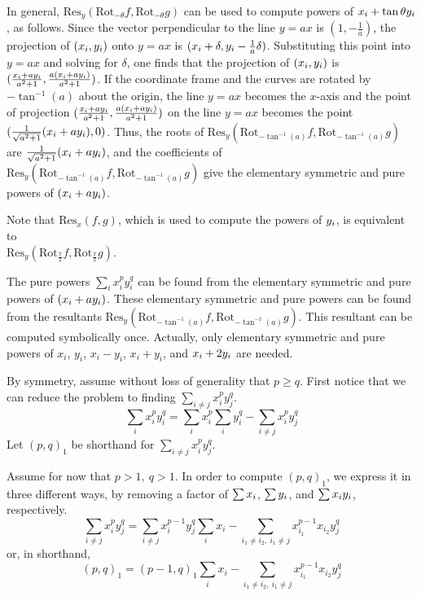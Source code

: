 In general, $\mbox{Res}_{y}(\mbox{Rot}_{-\theta}f,\mbox{Rot}_{-\theta}g)$ can be
used to compute powers of $x_{i} + \tan\theta y_{i}$, as follows.
Since the vector perpendicular to the line $y = ax$ is $(1,-\frac{1}{a})$,
the projection of $(x_{i},y_{i})$ onto $y = ax$ is $(x_{i} + \delta, y_{i} - \frac{1}{a} \delta)$.
Substituting this point into $y=ax$ and solving for $\delta$,
one finds that the projection of $(x_{i},y_{i})$ is 
$(\frac{x_{i} + ay_{i}}{a^{2} + 1},
 \frac{a(x_{i} + ay_{i})}{a^{2} + 1})$.
If the coordinate frame and the curves are rotated by $-\tan^{-1}(a)$
about the origin, the line $y = ax$ becomes the $x$-axis and the point of projection
$(\frac{x_{i} + ay_{i}}{a^{2} + 1}, \frac{a(x_{i} + ay_{i})}{a^{2} + 1})$ on the line
$y = ax$ becomes the point $(\frac{1}{\sqrt{a^{2}+1}}(x_{i} + ay_{i}), 0)$.
Thus, the roots of $\mbox{Res}_{y}(\mbox{Rot}_{-\tan^{-1}(a)}f,\mbox{Rot}_{-\tan^{-1}(a)}g)$
are $\frac{1}{\sqrt{a^{2}+1}}(x_{i} + ay_{i})$,
and the coefficients of 
$\mbox{Res}_{y}(\mbox{Rot}_{-\tan^{-1}(a)}f,\mbox{Rot}_{-\tan^{-1}(a)}g)$
give the elementary symmetric and pure powers of $(x_{i} + ay_{i})$.

Note that $\mbox{Res}_{x}(f,g)$, which is used to compute the powers of $y_{i}$,
is equivalent to \\
$\mbox{Res}_{y}(\mbox{Rot}_{\frac{\pi}{2}}f,\mbox{Rot}_{\frac{\pi}{2}}g)$.

\begin{lemma}
The pure powers $\sum_{i} x_{i}^{p}y_{i}^{q}$ can be found from the elementary symmetric
and pure powers of $(x_{i} + ay_{i})$.
These elementary symmetric and pure powers can be found from the
resultants $\mbox{Res}_{y}(\mbox{Rot}_{-\tan^{-1}(a)}f,\mbox{Rot}_{-\tan^{-1}(a)}g)$.
This resultant can be computed symbolically once.
Actually, only elementary symmetric
and pure powers of $x_{i}$, $y_{i}$, $x_{i}-y_{i}$, $x_{i}+y_{i}$, and $x_{i} + 2y_{i}$ 
are needed.
\end{lemma}
By symmetry, assume without loss of generality that $p \geq q$.
First notice that we can reduce the problem to finding $\sum_{i \neq j} x_{i}^{p} y_{j}^{q}$.
\[ \sum_{i} x_{i}^{p}y_{i}^{q} = 
   \sum_{i} x_{i}^{p} 	\sum_{i} y_{i}^{q} -  	\sum_{i \neq j} x_{i}^{p} y_{j}^{q}
\]
Let $(p,q)_{1}$ be shorthand for $\sum_{i \neq j} x_{i}^{p} y_{j}^{q}$.

Assume for now that $p > 1,\ q > 1$.
In order to compute $(p,q)_{1}$, 
we express it in three different ways, by removing a factor
of $\sum x_{i}$, $\sum y_{i}$, and $\sum x_{i}y_{i}$, respectively.
\begin{equation}
\sum_{i \neq j} x_{i}^{p} y_{j}^{q} = 
   \sum_{i \neq j} x_{i}^{p-1} y_{j}^{q}	\sum_{i} x_{i}  	-
   \sum_{i_{1} \neq i_{2},\ i_{1} \neq j} x_{i_{1}}^{p-1} x_{i_{2}}  y_{j}^{q} 
\end{equation}
or, in shorthand,
\begin{equation}
\label{eq5}
(p,q)_{1} =  (p-1,q)_{1} \sum_{i} x_{i}  -
	\sum_{i_{1} \neq i_{2},\ i_{1} \neq j} x_{i_{1}}^{p-1} x_{i_{2}}  y_{j}^{q} 
\end{equation}

